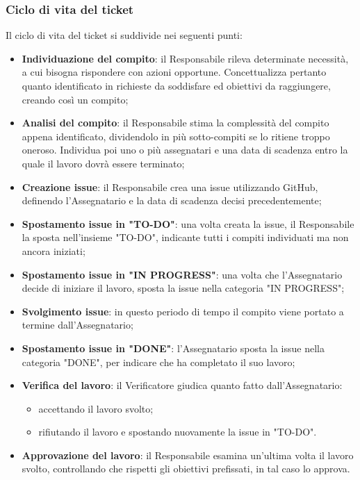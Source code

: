 \subsubsection{Ciclo di vita del ticket}
Il ciclo di vita del ticket si suddivide nei seguenti punti:
\begin {itemize}
    \item \textbf{Individuazione del compito}: il Responsabile rileva determinate necessità, a cui bisogna rispondere con azioni opportune. Concettualizza pertanto quanto identificato in richieste da soddisfare ed obiettivi da raggiungere, creando così un compito;
    \item \textbf{Analisi del compito}: il Responsabile stima la complessità del compito appena identificato, dividendolo in più sotto-compiti se lo ritiene troppo oneroso. Individua poi uno o più assegnatari e una data di scadenza entro la quale il lavoro dovrà essere terminato;
    \item \textbf{Creazione issue}: il Responsabile crea una issue utilizzando GitHub, definendo l’Assegnatario e la data di scadenza decisi precedentemente;
    \item \textbf{Spostamento issue in "TO-DO"}: una volta creata la issue, il Responsabile la sposta nell’insieme "TO-DO", indicante tutti i compiti individuati ma non ancora iniziati;
    \item \textbf{Spostamento issue in "IN PROGRESS"}: una volta che l’Assegnatario decide di iniziare il lavoro, sposta la issue nella categoria "IN PROGRESS";
    \item \textbf{Svolgimento issue}: in questo periodo di tempo il compito viene portato a termine dall'Assegnatario;
    \item \textbf{Spostamento issue in "DONE"}: l’Assegnatario sposta la issue nella categoria "DONE", per indicare che ha completato il suo lavoro;
    \item \textbf{Verifica del lavoro}: il Verificatore giudica quanto fatto dall’Assegnatario:
    \begin {itemize}
        \item accettando il lavoro svolto;
        \item rifiutando il lavoro e spostando nuovamente la issue in "TO-DO".
    \end {itemize}
    \item \textbf{Approvazione del lavoro}: il Responsabile esamina un’ultima volta il lavoro svolto, controllando che rispetti gli obiettivi prefissati, in tal caso lo approva.
\end {itemize}
